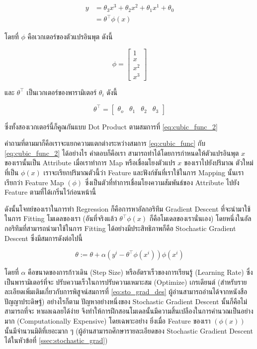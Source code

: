 \begin{align}\label{eq:cubic_func_2}
    y &= \theta_{3}x^{3} + \theta_{2}x^{2} + \theta_{1}x^{1} + \theta_{0} \nonumber \\ 
      &= \theta^{\top}\phi(x)
\end{align}

\noindent โดยที่ $\phi$ คือเวกเตอร์ของตัวแปรอินพุต ดังนี้

\begin{equation}
\phi = 
\begin{bmatrix}
    1 \\
    x \\
    x^{2} \\
    x^{3} 
\end{bmatrix}
\end{equation}

\noindent และ $\theta^{\top}$ เป็นเวกเตอร์ของพารามิเตอร์ $\theta_{i}$ ดังนี้

\begin{equation}
\theta^{\top} =
\begin{bmatrix}
    \theta_{o} & \theta_{1} & \theta_{2} & \theta_{3}
\end{bmatrix}
\end{equation}

\noindent ซึ่งทั้งสองเวกเตอร์นี้ก็คูณกันแบบ Dot Product ตามสมการที่ \ref{eq:cubic_func_2}
 
คำถามที่ตามมาก็คือเราจะแยกความแตกต่างระหว่างสมการ \ref{eq:cubic_func} กับ \ref{eq:cubic_func_2} ได้อย่างไร คำตอบก็คือเรา%
สามารถทำได้โดยการกำหนดให้ตัวแปรอินพุต $x$ ของเรานั้นเป็น Attribute เมื่อเราทำการ Map หรือเชื่อมโยงตัวแปร $x$ ของเราไปยังปริมาณ%
ตัวใหม่ที่เป็น $\phi(x)$ เราจะเรียกปริมาณตัวนี้ว่า Feature และฟังก์ชันที่เราใช้ในการ Mapping นั้นเราเรียกว่า Feature Map $(\phi)$ 
ซึ่งเป็นตัวที่ทำการเชื่อมโยงความสัมพันธ์ของ Attribute ไปยัง Feature ตามที่ได้เกริ่นไว้ก่อนหน้านี้

ดังนั้นโจทย์ของเราในการทำ Regression ก็คือการหาอัลกอริทึม Gradient Descent ที่จะนำมาใช้ในการ Fitting โมเดลของเรา (อันที่จริงแล้ว
$\theta^{\top}\phi(x)$ ก็คือโมเดลของเรานั่นเอง) โดยหนึ่งในอัลกอริทึมที่สามารถนำมาใช้ในการ Fitting ได้อย่างมีประสิทธิภาพก็คือ 
Stochastic Gradient Descent ซึ่งมีสมการดังต่อไปนี้

\begin{equation}\label{eq:sto_grad_des}
    \theta := \theta + \alpha (y^{i} - \theta^{\top}\phi(x^{i}))\phi(x^{i})
\end{equation}

\noindent โดยที่ $\alpha$ คือขนาดของการก้าวเดิน (Step Size) หรืออัตราเร็วของการเรียนรู้ (Learning Rate) ซึ่งเป็นพารามิเตอร์ที่จะ%
ปรับความเร็วในการปรับความเหมาะสม (Optimize) เกรเดียนต์ (สำหรับรายละเอียดเพิ่มเติมเกี่ยวกับการพิสูจน์สมการที่ \ref{eq:sto_grad_des} 
ผู้อ่านสามารถอ่านได้จากหนังสือปัญญาประดิษฐ์) อย่างไรก็ตาม ปัญหาอย่างหนึ่งของ Stochastic Gradient Descent นั้นก็คือไม่สามารถที่จะ%
หาผลเฉลยได้ง่าย จึงทำให้การฝึกสอนโมเดลนั้นมีความสิ้นเปลืองในการคำนวณเป็นอย่างมาก (Computationally Expensive) โดยเฉพาะอย่าง%
ยิ่งเมื่อ Feature ของเรา $(\phi(x))$ นั้นมีจำนวนมิติที่เยอะมาก ๆ (ผู้อ่านสามารถศึกษารายละเอียดของ Stochastic Gradient Descent 
ได้ในหัวข้อที่ \ref{ssec:stochastic_grad})

